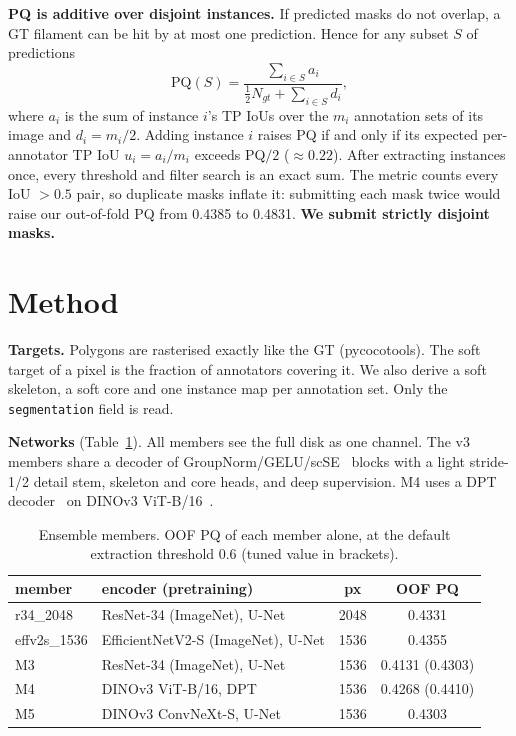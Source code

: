 \textbf{PQ is additive over disjoint instances.} If predicted masks do not overlap, a GT filament can be hit by at
most one prediction. Hence for any subset $S$ of predictions
\begin{equation}
\mathrm{PQ}(S)=\frac{\sum_{i\in S} a_i}{\tfrac12 N_{gt}+\sum_{i\in S} d_i},
\end{equation}
where $a_i$ is the sum of instance $i$'s TP IoUs over the $m_i$ annotation sets of its image and $d_i=m_i/2$.
Adding instance $i$ raises PQ if and only if its expected per-annotator TP IoU $u_i=a_i/m_i$ exceeds PQ$/2$
($\approx0.22$). After extracting instances once, every threshold and filter search is an exact sum. The metric
counts every IoU $>0.5$ pair, so duplicate masks inflate it: submitting each mask twice would raise our
out-of-fold PQ from 0.4385 to 0.4831. \textbf{We submit strictly disjoint masks.}

\section{Method}
\textbf{Targets.} Polygons are rasterised exactly like the GT (pycocotools). The soft target of a pixel is the
fraction of annotators covering it. We also derive a soft skeleton, a soft core and one instance map per annotation
set. Only the \texttt{segmentation} field is read.

\textbf{Networks} (Table~\ref{tab:members}). All members see the full disk as one channel. The v3 members share a
decoder of GroupNorm/GELU/scSE~\cite{roy2018scse} blocks with a light stride-1/2 detail stem, skeleton and core
heads, and deep supervision. M4 uses a DPT decoder~\cite{ranftl2021dpt} on DINOv3 ViT-B/16~\cite{dinov3}.

\begin{table}[t]
\caption{Ensemble members. OOF PQ of each member alone, at the default extraction threshold 0.6 (tuned value in
brackets).}\label{tab:members}
\centering\footnotesize
\begin{tabular}{@{}llcc@{}}
\toprule
member & encoder (pretraining) & px & OOF PQ \\
\midrule
r34\_2048 & ResNet-34 (ImageNet), U-Net & 2048 & 0.4331 \\
effv2s\_1536 & EfficientNetV2-S (ImageNet), U-Net & 1536 & 0.4355 \\
M3 & ResNet-34 (ImageNet), U-Net & 1536 & 0.4131 (0.4303) \\
M4 & DINOv3 ViT-B/16, DPT & 1536 & 0.4268 (0.4410) \\
M5 & DINOv3 ConvNeXt-S, U-Net & 1536 & 0.4303 \\
\bottomrule
\end{tabular}
\end{table}

